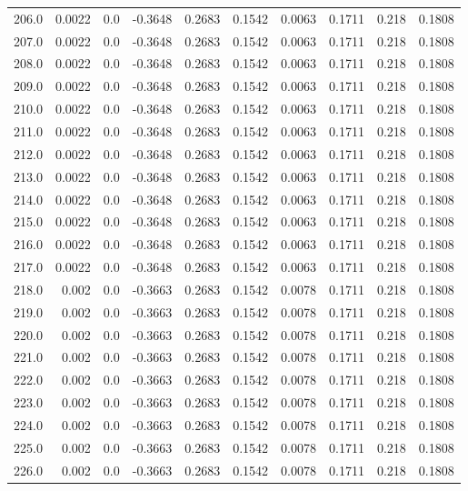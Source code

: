 \begin{longtable}{lrrrrrrrrr}
206.0 & 0.0022 & 0.0 & -0.3648 & 0.2683 & 0.1542 & 0.0063 & 0.1711 & 0.218 & 0.1808 \\
207.0 & 0.0022 & 0.0 & -0.3648 & 0.2683 & 0.1542 & 0.0063 & 0.1711 & 0.218 & 0.1808 \\
208.0 & 0.0022 & 0.0 & -0.3648 & 0.2683 & 0.1542 & 0.0063 & 0.1711 & 0.218 & 0.1808 \\
209.0 & 0.0022 & 0.0 & -0.3648 & 0.2683 & 0.1542 & 0.0063 & 0.1711 & 0.218 & 0.1808 \\
210.0 & 0.0022 & 0.0 & -0.3648 & 0.2683 & 0.1542 & 0.0063 & 0.1711 & 0.218 & 0.1808 \\
211.0 & 0.0022 & 0.0 & -0.3648 & 0.2683 & 0.1542 & 0.0063 & 0.1711 & 0.218 & 0.1808 \\
212.0 & 0.0022 & 0.0 & -0.3648 & 0.2683 & 0.1542 & 0.0063 & 0.1711 & 0.218 & 0.1808 \\
213.0 & 0.0022 & 0.0 & -0.3648 & 0.2683 & 0.1542 & 0.0063 & 0.1711 & 0.218 & 0.1808 \\
214.0 & 0.0022 & 0.0 & -0.3648 & 0.2683 & 0.1542 & 0.0063 & 0.1711 & 0.218 & 0.1808 \\
215.0 & 0.0022 & 0.0 & -0.3648 & 0.2683 & 0.1542 & 0.0063 & 0.1711 & 0.218 & 0.1808 \\
216.0 & 0.0022 & 0.0 & -0.3648 & 0.2683 & 0.1542 & 0.0063 & 0.1711 & 0.218 & 0.1808 \\
217.0 & 0.0022 & 0.0 & -0.3648 & 0.2683 & 0.1542 & 0.0063 & 0.1711 & 0.218 & 0.1808 \\
218.0 & 0.002 & 0.0 & -0.3663 & 0.2683 & 0.1542 & 0.0078 & 0.1711 & 0.218 & 0.1808 \\
219.0 & 0.002 & 0.0 & -0.3663 & 0.2683 & 0.1542 & 0.0078 & 0.1711 & 0.218 & 0.1808 \\
220.0 & 0.002 & 0.0 & -0.3663 & 0.2683 & 0.1542 & 0.0078 & 0.1711 & 0.218 & 0.1808 \\
221.0 & 0.002 & 0.0 & -0.3663 & 0.2683 & 0.1542 & 0.0078 & 0.1711 & 0.218 & 0.1808 \\
222.0 & 0.002 & 0.0 & -0.3663 & 0.2683 & 0.1542 & 0.0078 & 0.1711 & 0.218 & 0.1808 \\
223.0 & 0.002 & 0.0 & -0.3663 & 0.2683 & 0.1542 & 0.0078 & 0.1711 & 0.218 & 0.1808 \\
224.0 & 0.002 & 0.0 & -0.3663 & 0.2683 & 0.1542 & 0.0078 & 0.1711 & 0.218 & 0.1808 \\
225.0 & 0.002 & 0.0 & -0.3663 & 0.2683 & 0.1542 & 0.0078 & 0.1711 & 0.218 & 0.1808 \\
226.0 & 0.002 & 0.0 & -0.3663 & 0.2683 & 0.1542 & 0.0078 & 0.1711 & 0.218 & 0.1808 \\

\end{longtable}
